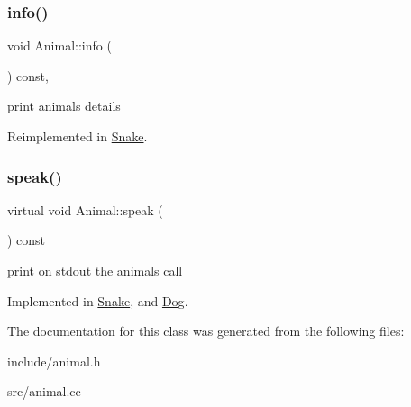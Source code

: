 \subsubsection{\texorpdfstring{info()}{info()}}
{\footnotesize\ttfamily void Animal\+::info (\begin{DoxyParamCaption}{ }\end{DoxyParamCaption}) const\hspace{0.3cm}{\ttfamily [virtual]}, {\ttfamily [noexcept]}}

print animal\textquotesingle{}s details 

Reimplemented in \hyperlink{classSnake_a502e4a95caef8a4220527a31cc67d8dc}{Snake}.

\mbox{\label{classAnimal_ae3f640ffd5ebec66c3836b63fd11fc27}} 
\subsubsection{\texorpdfstring{speak()}{speak()}}
{\footnotesize\ttfamily virtual void Animal\+::speak (\begin{DoxyParamCaption}{ }\end{DoxyParamCaption}) const\hspace{0.3cm}{\ttfamily [pure virtual]}}

print on stdout the animal\textquotesingle{}s call 

Implemented in \hyperlink{classSnake_ade354a78eec6fbf9c3d72a519089c65d}{Snake}, and \hyperlink{classDog_a1b6e9a2b762fe5f905cb603789b59737}{Dog}.



The documentation for this class was generated from the following files\+:\begin{DoxyCompactItemize}
\item 
include/animal.\+h\item 
src/animal.\+cc\end{DoxyCompactItemize}
